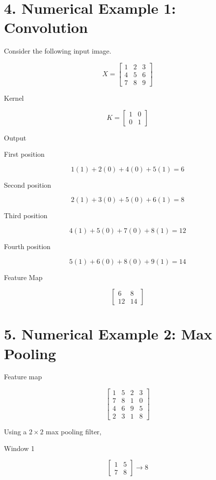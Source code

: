 \documentclass[11pt]{article}
\begin{document}
\section*{4. Numerical Example 1: Convolution}

Consider the following input image.

\[
X=
\begin{bmatrix}
1&2&3\\
4&5&6\\
7&8&9
\end{bmatrix}
\]

Kernel

\[
K=
\begin{bmatrix}
1&0\\
0&1
\end{bmatrix}
\]

Output

First position

\[
1(1)+2(0)+4(0)+5(1)=6
\]

Second position

\[
2(1)+3(0)+5(0)+6(1)=8
\]

Third position

\[
4(1)+5(0)+7(0)+8(1)=12
\]

Fourth position

\[
5(1)+6(0)+8(0)+9(1)=14
\]

Feature Map

\[
\begin{bmatrix}
6&8\\
12&14
\end{bmatrix}
\]

\section*{5. Numerical Example 2: Max Pooling}

Feature map

\[
\begin{bmatrix}
1&5&2&3\\
7&8&1&0\\
4&6&9&5\\
2&3&1&8
\end{bmatrix}
\]

Using a $2\times2$ max pooling filter,

Window 1

\[
\begin{bmatrix}
1&5\\
7&8
\end{bmatrix}
\rightarrow 8
\]
\end{document}
